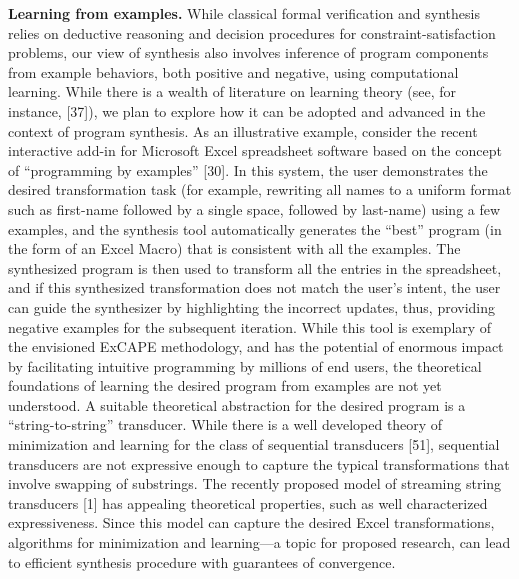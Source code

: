 \textbf{Learning from examples.} While classical formal verification and synthesis relies on deductive reasoning and decision procedures for constraint-satisfaction problems, our view of synthesis also involves inference of program components from example behaviors, both positive and negative, using computational learning. While there is a wealth of literature on learning theory (see, for instance, [37]), we plan to explore how it can be adopted and advanced in the context of program synthesis. As an illustrative example, consider the recent interactive add-in for Microsoft Excel spreadsheet software based on the concept of “programming by examples” [30]. In this system, the user demonstrates the desired transformation task (for example, rewriting all names to a uniform format such as first-name followed by a single space, followed by last-name) using a few examples, and the synthesis tool automatically generates the “best” program (in the form of an Excel Macro) that is consistent with all the examples. The synthesized program is then used to transform all the entries in the spreadsheet, and if this synthesized transformation does not match the user’s intent, the user can guide the synthesizer by highlighting the incorrect updates, thus, providing negative examples for the subsequent iteration. While this tool is exemplary of the envisioned ExCAPE methodology, and has the potential of enormous impact by facilitating intuitive programming by millions of end users, the theoretical foundations of learning the desired program from examples are not yet understood. A suitable theoretical abstraction for the desired program is a “string-to-string” transducer. While there is a well developed theory of minimization and learning for the class of sequential transducers [51], sequential transducers are not expressive enough to capture the typical transformations that involve swapping of substrings. The recently proposed model of streaming string transducers [1] has appealing theoretical properties, such as well characterized expressiveness. Since this model can capture the desired Excel transformations, algorithms for minimization and learning—a topic for proposed research, can lead to efficient synthesis procedure with guarantees of convergence.

